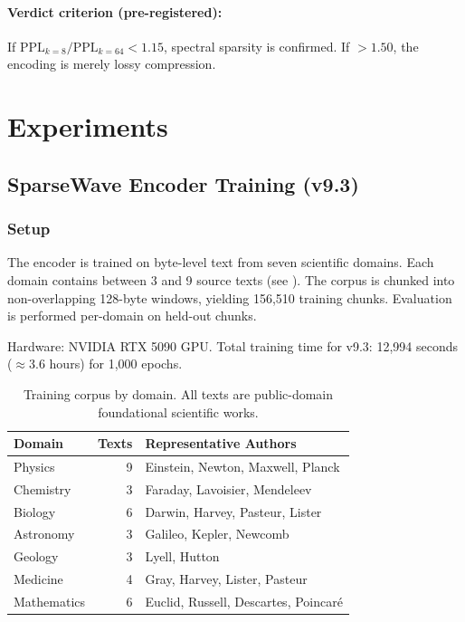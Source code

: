 \documentclass[10pt,twocolumn]{article}
\begin{document}
\paragraph{Verdict criterion (pre-registered):} If $\text{PPL}_{k=8} / \text{PPL}_{k=64} < 1.15$, spectral sparsity is confirmed. If $> 1.50$, the encoding is merely lossy compression.

\section{Experiments}

\subsection{SparseWave Encoder Training (v9.3)}

\subsubsection{Setup}

The encoder is trained on byte-level text from seven scientific domains. Each domain contains between 3 and 9 source texts (see ). The corpus is chunked into non-overlapping 128-byte windows, yielding 156,510 training chunks. Evaluation is performed per-domain on held-out chunks.

Hardware: NVIDIA RTX 5090 GPU. Total training time for v9.3: 12,994 seconds ($\approx$3.6 hours) for 1,000 epochs.

\begin{table}[t]
\centering
\caption{Training corpus by domain. All texts are public-domain foundational scientific works.}
\label{tab:domains}
\small
\begin{tabular}{@{}lrl@{}}
\toprule
\textbf{Domain} & \textbf{Texts} & \textbf{Representative Authors} \\
\midrule
Physics     & 9 & Einstein, Newton, Maxwell, Planck \\
Chemistry   & 3 & Faraday, Lavoisier, Mendeleev \\
Biology     & 6 & Darwin, Harvey, Pasteur, Lister \\
Astronomy   & 3 & Galileo, Kepler, Newcomb \\
Geology     & 3 & Lyell, Hutton \\
Medicine    & 4 & Gray, Harvey, Lister, Pasteur \\
Mathematics & 6 & Euclid, Russell, Descartes, Poincar\'{e} \\
\bottomrule
\end{tabular}
\end{table}
\end{document}
